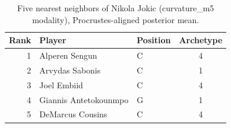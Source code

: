 \begin{table}[htbp]
  \centering\small
  \begin{tabular}{rllc}
    \toprule
    Rank & Player & Position & Archetype \\
    \midrule
    1 & Alperen Sengun & C & 4 \\
    2 & Arvydas Sabonis & C & 1 \\
    3 & Joel Embiid & C & 4 \\
    4 & Giannis Antetokounmpo & G & 1 \\
    5 & DeMarcus Cousins & C & 4 \\
    \bottomrule
  \end{tabular}
  \caption{Five nearest neighbors of Nikola Jokic (curvature_m5 modality), Procrustes-aligned posterior mean.}
  \label{tab:Nikola_Jokic_neighbors_curvature_m5}
\end{table}

